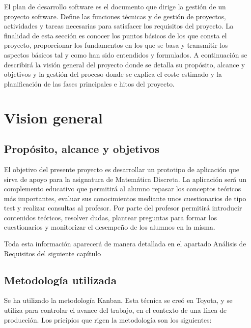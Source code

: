 \documentclass[openright,twoside,10pt]{book}
\begin{document}
    El plan de desarrollo software es el documento que dirige la gestión de
    un proyecto software. Define las funciones técnicas y de gestión de
    proyectos, actividades y tareas necesarias para satisfacer los
    requisitos del proyecto. La finalidad de esta sección es conocer los
    puntos básicos de los que consta el proyecto, proporcionar los
    fundamentos en los que se basa y transmitir los aspectos básicos tal y
    como han sido entendidos y formulados. A continuación se describirá la
    visión general del proyecto donde se detalla su propósito, alcance y
    objetivos y la gestión del proceso donde se explica el coste estimado y
    la planificación de las fases principales e hitos del proyecto.
    
    \section{Vision general}\label{vision-general}
    
    \subsection{Propósito, alcance y
    objetivos}\label{propuxf3sito-alcance-y-objetivos}
    
    El objetivo del presente proyecto es desarrollar un prototipo de
    aplicación que sirva de apoyo para la asignatura de Matemática Discreta.
    La aplicación será un complemento educativo que permitirá al alumno
    repasar los conceptos teóricos más importantes, evaluar sus
    conocimientos mediante unos cuestionarios de tipo test y realizar
    consultas al profesor. Por parte del profesor permitirá introducir
    contenidos teóricos, resolver dudas, plantear preguntas para formar los
    cuestionarios y monitorizar el desempeño de los alumnos en la misma.
    
    Toda esta información aparecerá de manera detallada en el apartado
    Análisis de Requisitos del siguiente capítulo
    
    \subsection{Metodología utilizada}\label{metodologuxeda-utilizada}
    
    Se ha utilizado la metodología Kanban. Esta técnica se creó en Toyota, y
    se utiliza para controlar el avance del trabajo, en el contexto de una
    línea de producción. Los pricipios que rigen la metodología son los
    siguientes:
    
\end{document}
